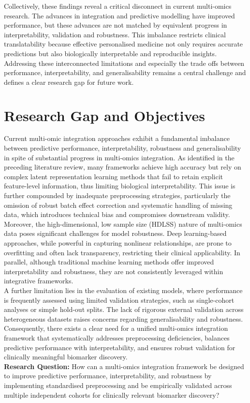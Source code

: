 \documentclass[conference]{IEEEtran}
\begin{document}
Collectively, these findings reveal a critical disconnect in
current multi-omics research. The advances in integration
and predictive modelling have improved performance, but these advances are not matched by equivalent progress in interpretability, validation and robustness. This imbalance restricts clinical translatability because effective personalised medicine not only requires accurate predictions but also biologically interpretable and reproducible insights. Addressing these interconnected limitations and especially the trade offs between performance, interpretability, and generalisability remains a central challenge
and defines a clear research gap for future work.


\section {Research Gap and Objectives}
Current multi-omic integration approaches exhibit a fundamental imbalance between predictive performance, interpretability, robustness and generalisability in spite of substantial progress in multi-omics integration. As identified in the preceding literature review, many frameworks achieve high accuracy but rely on complex latent representation learning methods that fail to retain explicit feature-level information, thus limiting biological interpretability. This issue is further compounded by inadequate preprocessing strategies, particularly the omission of robust batch effect correction and systematic handling of missing data, which introduces technical bias and compromises downstream validity.\\
Moreover, the high-dimensional, low sample size (HDLSS) nature of multi-omics data poses significant challenges for model robustness. Deep learning-based approaches, while powerful in capturing nonlinear relationships, are prone to overfitting and often lack transparency, restricting their clinical applicability. In parallel, although traditional machine learning methods offer improved interpretability and robustness, they are not consistently leveraged within integrative frameworks.\\
A further limitation lies in the evaluation of existing models, where performance is frequently assessed using limited validation strategies, such as single-cohort analyses or simple hold-out splits. The lack of rigorous external validation across heterogeneous datasets raises concerns regarding generalisability and robustness. Consequently, there exists a clear need for a unified multi-omics integration framework that systematically addresses preprocessing deficiencies, balances predictive performance with interpretability, and ensures robust validation for clinically meaningful biomarker discovery.\\
\textbf{Research Question:} 
How can a multi-omics integration framework be designed to improve predictive performance, interpretability, and robustness by implementing standardised preprocessing and be empirically validated across multiple independent cohorts for clinically relevant biomarker discovery?
\end{document}
